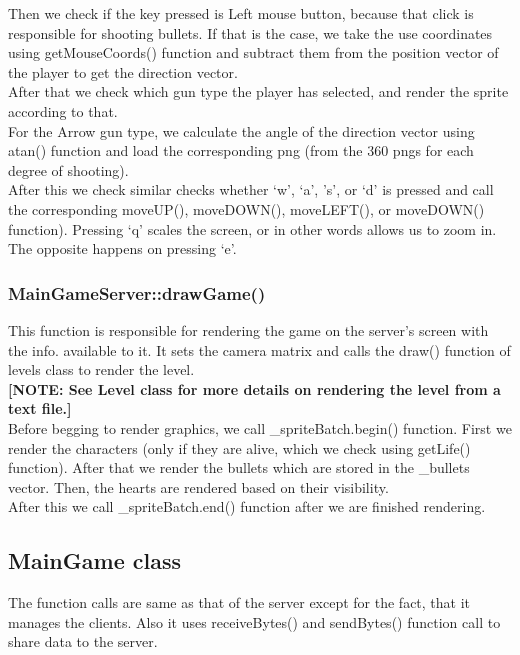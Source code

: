 \documentclass{article}
\begin{document}
Then we check if the key pressed is Left mouse button, because that click is responsible for shooting bullets. If that is the case, we take the use coordinates using getMouseCoords() function and subtract them from the position vector of the player to get the direction vector. \\
After that we check which gun type the player has selected, and render the sprite according to that. \\

For the Arrow gun type, we calculate the angle of the direction vector using atan() function and load the corresponding png (from the 360 pngs for each degree of shooting). \\

After this we check similar checks whether ‘w’, ‘a’, ’s’, or ‘d’ is pressed and call the corresponding moveUP(), moveDOWN(), moveLEFT(), or moveDOWN() function). Pressing ‘q’ scales the screen, or in other words allows us to zoom in. The opposite happens on pressing ‘e’.
\newline

\subsubsection{MainGameServer::drawGame() }
This function is responsible for rendering the game on the server’s screen with the info. available to it. It sets the camera matrix and calls the draw() function of levels class to render the level. \\

\textbf{[NOTE: See Level class for more details on rendering the level from a text file.]} \\

Before begging to render graphics, we call \_spriteBatch.begin() function. First we render the characters (only if they are alive, which we check using getLife() function). After that we render the bullets which are stored in the \_bullets vector. Then, the hearts are rendered based on their visibility. \\

After this we call \_spriteBatch.end() function after we are finished rendering.
\newline

\subsection{MainGame class}
The function calls are same as that of the server except for the fact, that it manages the clients. Also it uses receiveBytes() and sendBytes() function call to share data to the server.
\newline
\end{document}
